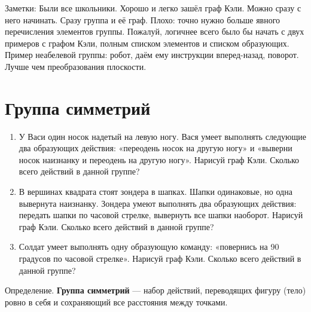 \documentclass[12pt]{article} %
\begin{document}
Заметки: Были все школьники. Хорошо и легко зашёл граф Кэли. Можно сразу с него начинать. Сразу группа и её граф. Плохо: точно нужно больше явного перечисления элементов группы. Пожалуй, логичнее всего было бы начать с двух примеров с графом Кэли, полным списком элементов и списком образующих. Пример неабелевой группы: робот, даём ему инструкции вперед-назад, поворот. Лучше чем преобразования плоскости.

\newpage
\section{Группа симметрий}

\begin{enumerate}
  \item У Васи один носок надетый на левую ногу. Вася умеет выполнять следующие два образующих действия: «переодень носок на другую ногу» и «выверни носок наизнанку и переодень на другую ногу». Нарисуй граф Кэли. Сколько всего действий в данной группе?
  \item В вершинах квадрата стоят зондера в шапках. Шапки одинаковые, но одна вывернута наизнанку. Зондера умеют выполнять два образующих действия: передать шапки по часовой стрелке, вывернуть все шапки наоборот. Нарисуй граф Кэли. Сколько всего действий в данной группе?
  \item Солдат умеет выполнять одну образующую команду: «повернись на 90 градусов по часовой стрелке». Нарисуй граф Кэли. Сколько всего действий в данной группе?
\end{enumerate}



Определение. \textbf{Группа симметрий} — набор действий, переводящих фигуру (тело) ровно в себя и сохраняющий все расстояния между точками.
\end{document}
